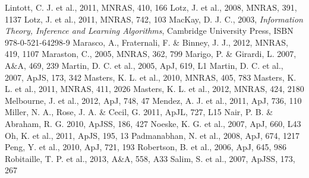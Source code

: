 \documentclass[useAMS,usenatbib]{mn2e}
\begin{document}
\begin{thebibliography}{}
 Lintott, C. J. et al., 2011, MNRAS, 410, 166
 Lotz, J. et al., 2008, MNRAS, 391, 1137
 Lotz, J. et al., 2011, MNRAS, 742, 103
 MacKay, D. J. C., 2003, \emph{Information Theory, Inference and Learning Algorithms}, Cambridge University Press, ISBN 978-0-521-64298-9
 Marasco, A., Fraternali, F. \& Binney, J. J., 2012, MNRAS, 419, 1107
 Maraston, C., 2005, MNRAS, 362, 799
 Marigo, P. \& Girardi, L. 2007, A\&A, 469, 239
 Martin, D. C. et al., 2005, ApJ, 619, L1
 Martin, D. C. et al., 2007, ApJS, 173, 342
 Masters, K. L. et al., 2010, MNRAS, 405, 783
 Masters, K. L. et al., 2011, MNRAS, 411, 2026
 Masters, K. L. et al., 2012, MNRAS, 424, 2180
 Melbourne, J. et al., 2012, ApJ, 748, 47
 Mendez, A. J. et al., 2011, ApJ, 736, 110
 Miller, N. A., Rose, J. A. \& Cecil, G. 2011, ApJL, 727, L15
 Nair, P. B. \& Abraham, R. G. 2010, ApJSS, 186, 427 
 Noeske, K. G. et al., 2007, ApJ, 660, L43
 Oh, K. et al., 2011, ApJS, 195, 13
 Padmanabhan, N. et al., 2008, ApJ, 674, 1217
 Peng, Y. et al., 2010, ApJ, 721, 193
 Robertson, B. et al., 2006, ApJ, 645, 986
 Robitaille, T. P. et al., 2013, A\&A, 558, A33
 Salim, S. et al., 2007, ApJSS, 173, 267

\end{thebibliography}
\end{document}
